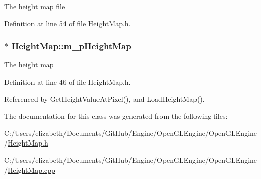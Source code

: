 The height map file 



Definition at line 54 of file Height\+Map.\+h.

\subsubsection[{\texorpdfstring{m\+\_\+p\+Height\+Map}{m_pHeightMap}}]{$\ast$ Height\+Map\+::m\+\_\+p\+Height\+Map\hspace{0.3cm}{\ttfamily [private]}}\hypertarget{class_height_map_a3b60ac0f926ebf20cbdf8f62ae6d8203}{}\label{class_height_map_a3b60ac0f926ebf20cbdf8f62ae6d8203}


The height map 



Definition at line 46 of file Height\+Map.\+h.



Referenced by Get\+Height\+Value\+At\+Pixel(), and Load\+Height\+Map().



The documentation for this class was generated from the following files\+:\begin{DoxyCompactItemize}
\item 
C\+:/\+Users/elizabeth/\+Documents/\+Git\+Hub/\+Engine/\+Open\+G\+L\+Engine/\+Open\+G\+L\+Engine/\hyperlink{_height_map_8h}{Height\+Map.\+h}\item 
C\+:/\+Users/elizabeth/\+Documents/\+Git\+Hub/\+Engine/\+Open\+G\+L\+Engine/\+Open\+G\+L\+Engine/\hyperlink{_height_map_8cpp}{Height\+Map.\+cpp}\end{DoxyCompactItemize}

